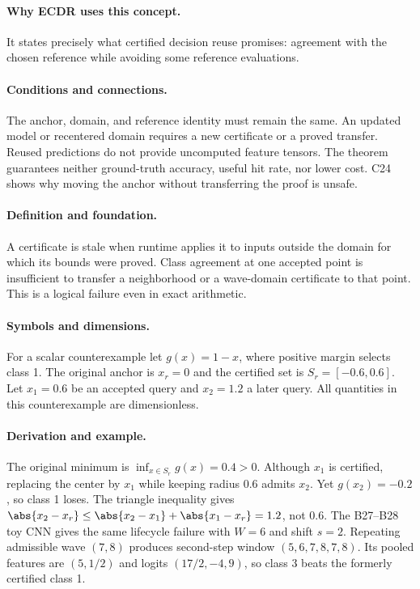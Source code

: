 \paragraph{Why ECDR uses this concept.}
It states precisely what certified decision reuse promises: agreement with the chosen reference while avoiding some reference evaluations.
\paragraph{Conditions and connections.}
The anchor, domain, and reference identity must remain the same. An updated model or recentered domain requires a new certificate or a proved transfer. Reused predictions do not provide uncomputed feature tensors. The theorem guarantees neither ground-truth accuracy, useful hit rate, nor lower cost. C24 shows why moving the anchor without transferring the proof is unsafe.

\paragraph{Definition and foundation.}
A certificate is stale when runtime applies it to inputs outside the domain for which its bounds were proved. Class agreement at one accepted point is insufficient to transfer a neighborhood or a wave-domain certificate to that point. This is a logical failure even in exact arithmetic.
\paragraph{Symbols and dimensions.}
For a scalar counterexample let $g(x)=1-x$, where positive margin selects class 1. The original anchor is $x_r=0$ and the certified set is $S_r=[-0.6,0.6]$. Let $x_1=0.6$ be an accepted query and $x_2=1.2$ a later query. All quantities in this counterexample are dimensionless.
\paragraph{Derivation and example.}
The original minimum is $\inf_{x\in S_r}g(x)=0.4>0$. Although $x_1$ is certified, replacing the center by $x_1$ while keeping radius 0.6 admits $x_2$. Yet $g(x_2)=-0.2$, so class 1 loses. The triangle inequality gives $\abs{x_2-x_r}\le\abs{x_2-x_1}+\abs{x_1-x_r}=1.2$, not 0.6.
The B27--B28 toy CNN gives the same lifecycle failure with $W=6$ and shift $s=2$. Repeating admissible wave $(7,8)$ produces second-step window $(5,6,7,8,7,8)$. Its pooled features are $(5,1/2)$ and logits $(17/2,-4,9)$, so class 3 beats the formerly certified class 1.
